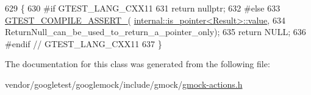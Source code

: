 \begin{DoxyCode}
629                                               \{
630 \textcolor{preprocessor}{#if GTEST\_LANG\_CXX11}
631     \textcolor{keywordflow}{return} \textcolor{keyword}{nullptr};
632 \textcolor{preprocessor}{#else}
633     \hyperlink{gtest-port_8h_ae1f37dc71d5daa6fb49ca1b6047d4a8c}{GTEST\_COMPILE\_ASSERT\_}(
      \hyperlink{structtesting_1_1internal_1_1bool__constant_a499fba6576296b04d99690a486424b32}{internal::is\_pointer<Result>::value},
634                           ReturnNull\_can\_be\_used\_to\_return\_a\_pointer\_only);
635     \textcolor{keywordflow}{return} NULL;
636 \textcolor{preprocessor}{#endif  // GTEST\_LANG\_CXX11}
637   \}
\end{DoxyCode}


The documentation for this class was generated from the following file\+:\begin{DoxyCompactItemize}
\item 
vendor/googletest/googlemock/include/gmock/\hyperlink{gmock-actions_8h}{gmock-\/actions.\+h}\end{DoxyCompactItemize}
